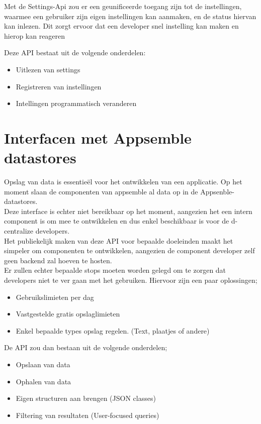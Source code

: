 Met de Settings-Api zou er een geunificeerde toegang zijn tot de instellingen, waarmee een gebruiker zijn eigen instellingen kan aanmaken, en de status hiervan kan inlezen. Dit zorgt ervoor dat een developer snel instelling kan maken en hierop kan reageren

Deze API bestaat uit de volgende onderdelen:

\begin{itemize}
	\item Uitlezen van settings
	\item Registreren van instellingen
	\item Intellingen programmatisch veranderen
\end{itemize}
 
\section{Interfacen met Appsemble datastores}

Opslag van data is essentie\"{e}l voor het ontwikkelen van een applicatie. Op het moment slaan de componenten van appsemble al data op in de Appsenble-datastores. \\

Deze interface is echter niet bereikbaar op het moment, aangezien het een intern component is om mee te ontwikkelen en dus enkel beschikbaar is voor de d-centralize developers. \\

Het publiekelijk maken van deze API voor bepaalde doeleinden maakt het simpeler om componenten te ontwikkelen, aangezien de component developer zelf geen backend zal hoeven te hosten. \\

Er zullen echter bepaalde stops moeten worden gelegd om te zorgen dat developers niet te ver gaan met het gebruiken. Hiervoor zijn een paar oplossingen;

\begin{itemize}
	\item Gebruikslimieten per dag
	\item Vastgestelde gratis opslaglimieten
	\item Enkel bepaalde types opslag regelen. (Text, plaatjes of andere)
\end{itemize}

De API zou dan bestaan uit de volgende onderdelen;

\begin{itemize}
	\item Opslaan van data
	\item Ophalen van data
	\item Eigen structuren aan brengen (JSON classes)
	\item Filtering van resultaten (User-focused queries)
\end{itemize}

